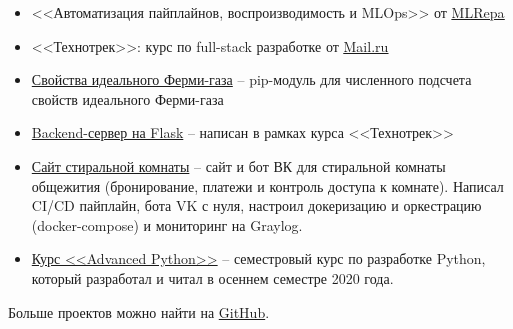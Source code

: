 
\begin{itemize}
    \item <<Автоматизация пайплайнов, воспроизводимость и MLOps>> от \href{https://ml-repa.ru/reproducibility-pipelines-automation-mlops}{\underline{MLRepa}}
	\item <<Технотрек>>: курс по full-stack разработке от \href{https://track.mail.ru/}{\underline{Mail.ru}}
\end{itemize}


\begin{itemize}
    \item \href{https://github.com/alekseik1/ifg-py}{Свойства идеального Ферми-газа} -- pip-модуль для численного подсчета свойств идеального Ферми-газа
    \item \href{https://github.com/alekseik1/tt-ridesharing-backend}{Backend-сервер на Flask} -- написан в рамках курса <<Технотрек>>
    \item \href{https://github.com/alekseik1/drec_stud_site}{Сайт стиральной комнаты} -- сайт и бот ВК для стиральной комнаты общежития (бронирование, платежи и контроль доступа к комнате). Написал CI/CD пайплайн, бота VK с нуля, настроил докеризацию и оркестрацию (docker-compose) и мониторинг на Graylog.
    \item \href{https://github.com/alekseik1/advanced_python_1sem_2020}{Курс <<Advanced Python>>} -- семестровый курс по разработке Python, который разработал и читал в осеннем семестре 2020 года.
\end{itemize}
Больше проектов можно найти на \href{https://github.com/alekseik1/}{GitHub}.

